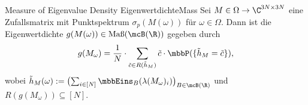 \begin{mpos}{Measure of Eigenvalue Density}
    {EigenwertdichteMass}
    Sei $M\in \Omega\to \C^{3N\times 3N}$ eine Zufallsmatrix mit Punktspektrum $\sigma_p(M(\omega))$ für $\omega\in\Omega$. Dann ist die Eigenwertdichte $g(M(\omega))\in\text{Maß}(\mcB(\R))$ gegeben durch 
    \[
        g(M_\omega) = \frac{1}{N}\cdot\sum_{\tilde c\in R(\tilde h_M)}\tilde c\cdot\mbbP(\{\tilde h_M = \tilde c\}),
    \]
    wobei $\tilde h_{M}(\omega) := \bigl(\sum_{i\in[N]}\mbbEins_{B}(\lambda(M_\omega)_i)\bigr)_{B\in\mcB(\R)}$ und $R(g(M_\omega)) \subseteq [N]$.
\end{mpos}